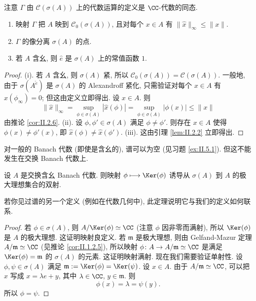注意 $\Gamma$ 由 $\mathcal{C}(\sigma(A))$ 上的代数运算的定义是 $\CC$-代数的同态.

\begin{theorem}
\label{thm:II.2.9}
\begin{enumerate}
\item[(i)] 映射 $\Gamma$ 把 $A$ 映到 $\mathcal{C}_0(\sigma(A))$, 且对每个 $x \in A$ 有 $\|\hat{x}\|_{\infty} \leq \|x\|$.
\item[(ii)] $\Gamma$ 的像分离 $\sigma(A)$ 的点.
\item[(iii)] 若 $A$ 含幺, 则 $\hat{e}$ 是 $\sigma(A)$ 上的常值函数 $1$.
\end{enumerate}
\end{theorem}

\begin{proof}
(i). 若 $A$ 含幺, 则 $\sigma(A)$ 紧, 所以 $\mathcal{C}_0(\sigma(A)) = \mathcal{C}(\sigma(A))$. 一般地, 由于 $\sigma(A^{\tilde{e}})$ 是 $\sigma(A)$ 的 Alexandroff 紧化, 只需验证对每个 $x \in A$ 有 $\hat{x}(\phi_{\infty}) = 0$; 但这由定义立即得出.
设 $x \in A$. 则
\[
\|\hat{x}\|_{\infty} = \sup_{\phi \in \sigma(A)}|\hat{x}(\phi)| = \sup_{\phi \in \sigma(A)}|\phi(x)| \leq \|x\|
\]
由推论 \ref{cor:II.2.6}.
(ii). 设 $\phi, \phi' \in \sigma(A)$ 满足 $\phi \neq \phi'$. 则存在 $x \in A$ 使得 $\phi(x) \neq \phi'(x)$, 即 $\hat{x}(\phi) \neq \hat{x}(\phi')$.
(iii). 这由引理 \ref{lem:II.2.2} 立即得出.
\end{proof}

对一般的 Banach 代数 (即使是含幺的), 谱可以为空 (见习题 \ref{ex:II.5.1}). 但这不能发生在交换 Banach 代数上.

\begin{theorem}[谱与极大理想的双射]
\label{thm:II.2.10}
设 $A$ 是交换含幺 Banach 代数. 则映射 $\phi \longmapsto \Ker(\phi)$ 诱导从 $\sigma(A)$ 到 $A$ 的极大理想集合的双射.
\end{theorem}

若你见过谱的另一个定义 (例如在代数几何中), 此定理说明它与我们的定义如何联系.

\begin{proof}
若 $\phi \in \sigma(A)$, 则 $A/\Ker(\phi) \simeq \CC$ (注意 $\phi$ 因非零而满射), 所以 $\Ker(\phi)$ 是 $A$ 的极大理想. 这证明映射良定义.
若 $\mathfrak{m}$ 是极大理想, 则由 Gelfand-Mazur 定理 $A/\mathfrak{m} \simeq \CC$ (见推论 \ref{cor:II.1.2.5}), 所以映射 $\phi \colon A \to A/\mathfrak{m} \simeq \CC$ 是满足 $\Ker(\phi) = \mathfrak{m}$ 的 $\sigma(A)$ 的元素. 这证明映射满射.
现在我们需要验证单射性. 设 $\phi, \psi \in \sigma(A)$ 满足 $\mathfrak{m} := \Ker(\phi) = \Ker(\psi)$. 设 $x \in A$. 由于 $A/\mathfrak{m} \simeq \CC$, 可以把 $x$ 写成 $x = \lambda e + y$, 其中 $\lambda \in \CC$, $y \in \mathfrak{m}$. 则
\[
\phi(x) = \lambda = \psi(y).
\]
所以 $\phi = \psi$.
\end{proof}

